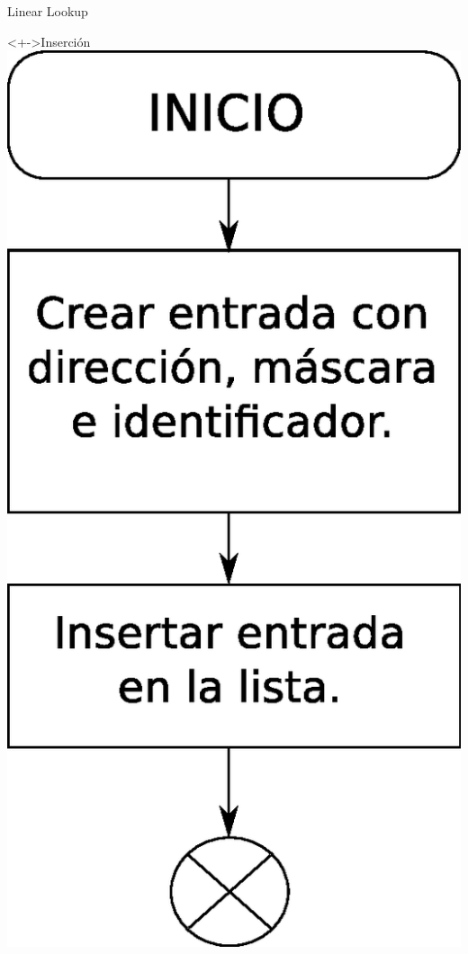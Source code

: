 \documentclass[xcolor=dvipsnames]{beamer}
\begin{document}
\begin{frame}{Linear Lookup}
\begin{block}<+->{Inserción}
	\center	
	\includegraphics[scale=0.50]{figures/lluinsert.eps}
\end{block}
\end{frame}
\end{document}
